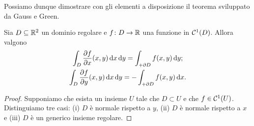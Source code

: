 Possiamo dunque dimostrare con gli elementi a disposizione il teorema sviluppato da Gauss e Green.
\begin{teorema} \label{t:gauss-green}
	Sia $D\subseteq\mathbb{R}^2$ un dominio regolare e $f\colon D\to\mathbb{R}$ una funzione in $\mathcal{C}^{{1}}(D)$.
	Allora valgono
	\begin{gather}
		\int_D\frac{\partial {f}}{\partial {x}}(x,y)\,\textup{d} x\,\textup{d} y=\int_{+\partial D}f(x,y)\,\textup{d} y;
		\label{eq:gauss-green-y}\\
		\int_D\frac{\partial {f}}{\partial {y}}(x,y)\,\textup{d} x\,\textup{d} y=-\int_{+\partial D}f(x,y)\,\textup{d} x.
		\label{eq:gauss-green-x}
	\end{gather}
\end{teorema}
\begin{proof}
	Supponiamo che esista un insieme $U$ tale che $D\subset U$ e che $f\in\mathcal{C}^{{1}}(U)$.
	Distinguiamo tre casi: (i) $D$ è normale rispetto a $y$, (ii) $D$ è normale rispetto a $x$ e (iii) $D$ è un generico insieme regolare.


\end{proof}
